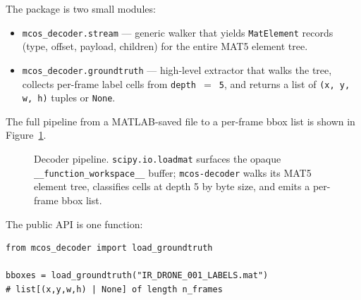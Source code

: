 \documentclass{article}
\begin{document}
The package is two small modules:

\begin{itemize}
  \item \texttt{mcos\_decoder.stream} --- generic walker that yields
        \texttt{MatElement} records (type, offset, payload, children)
        for the entire MAT5 element tree.
  \item \texttt{mcos\_decoder.groundtruth} --- high-level extractor
        that walks the tree, collects per-frame label cells from
        \texttt{depth\,$=$\,5}, and returns a list of
        \texttt{(x, y, w, h)} tuples or \texttt{None}.
\end{itemize}

The full pipeline from a MATLAB-saved file to a per-frame bbox list is
shown in Figure~\ref{fig:pipeline}.

\begin{figure}[ht]
\centering
{}
\caption{Decoder pipeline. \texttt{scipy.io.loadmat} surfaces the
opaque \texttt{\_\_function\_workspace\_\_} buffer;
\texttt{mcos-decoder} walks its MAT5 element tree, classifies cells at
depth 5 by byte size, and emits a per-frame bbox list.}
\label{fig:pipeline}
\end{figure}

The public API is one function:

\begin{lstlisting}
from mcos_decoder import load_groundtruth

bboxes = load_groundtruth("IR_DRONE_001_LABELS.mat")
# list[(x,y,w,h) | None] of length n_frames
\end{lstlisting}
\end{document}
